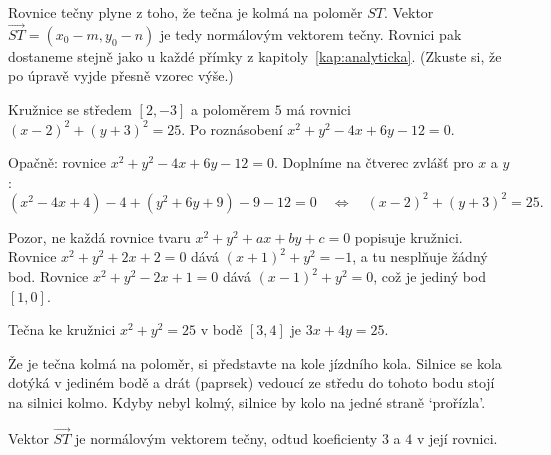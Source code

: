 Rovnice tečny plyne z toho, že tečna je kolmá na poloměr $ST$. Vektor $\overrightarrow{ST} = (x_0 - m, y_0 - n)$ je tedy normálovým vektorem tečny. Rovnici pak dostaneme stejně jako u každé přímky z kapitoly~\ref{kap:analyticka}. (Zkuste si, že po úpravě vyjde přesně vzorec výše.)

\begin{example}
  Kružnice se středem $[2, -3]$ a poloměrem $5$ má rovnici ${(x - 2)}^2 + {(y + 3)}^2 = 25$. Po roznásobení $x^2 + y^2 - 4x + 6y - 12 = 0$.

  Opačně: rovnice $x^2 + y^2 - 4x + 6y - 12 = 0$. Doplníme na čtverec zvlášť pro $x$ a $y$:
  \begin{equation*}
    (x^2 - 4x + 4) - 4 + (y^2 + 6y + 9) - 9 - 12 = 0\quad\Leftrightarrow\quad{(x - 2)}^2 + {(y + 3)}^2 = 25.
  \end{equation*}

  Pozor, ne každá rovnice tvaru $x^2 + y^2 + ax + by + c = 0$ popisuje kružnici. Rovnice $x^2 + y^2 + 2x + 2 = 0$ dává ${(x + 1)}^2 + y^2 = -1$, a tu nesplňuje žádný bod. Rovnice $x^2 + y^2 - 2x + 1 = 0$ dává ${(x - 1)}^2 + y^2 = 0$, což je jediný bod $[1, 0]$.
\end{example}

\begin{example}
  Tečna ke kružnici $x^2 + y^2 = 25$ v bodě $[3, 4]$ je $3x + 4y = 25$.
\end{example}

Že je tečna kolmá na poloměr, si představte na kole jízdního kola. Silnice se kola dotýká v jediném bodě a drát (paprsek) vedoucí ze středu do tohoto bodu stojí na silnici kolmo. Kdyby nebyl kolmý, silnice by kolo na jedné straně `prořízla'.

\begin{center}
\end{center}
Vektor $\overrightarrow{ST}$ je normálovým vektorem tečny, odtud koeficienty $3$ a $4$ v její rovnici.

